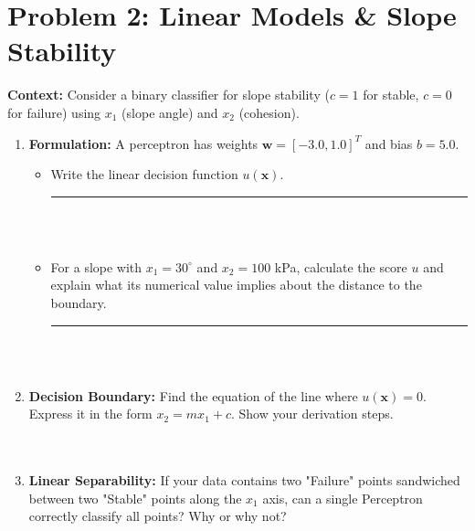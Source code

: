 \documentclass[12pt]{article}
\begin{document}
\section{Problem 2: Linear Models \& Slope Stability}
\textbf{Context:} Consider a binary classifier for slope stability ($c=1$ for stable, $c=0$ for failure) using $x_1$ (slope angle) and $x_2$ (cohesion).

\begin{enumerate}[label=(\alph*)]
    \item \textbf{Formulation:} A perceptron has weights $\bm{w} = [-3.0, 1.0]^T$ and bias $b = 5.0$. 
    \begin{itemize}
        \item Write the linear decision function $u(\bm{x})$. \rule{2.5in}{0.15mm} \\
        
        \fullunderline \\
        
        \item For a slope with $x_1 = 30^\circ$ and $x_2 = 100$ kPa, calculate the score $u$ and explain what its numerical value implies about the distance to the boundary. \rule{1in}{0.15mm} \\
        
        \fullunderline \\
        
    \end{itemize}

    \item \textbf{Decision Boundary:} Find the equation of the line where $u(\bm{x}) = 0$. Express it in the form $x_2 = m x_1 + c$. Show your derivation steps. \\
    
    \fullunderline \\
    
    \fullunderline \\

    \item \textbf{Linear Separability:} If your data contains two "Failure" points sandwiched between two "Stable" points along the $x_1$ axis, can a single Perceptron correctly classify all points? Why or why not? \\
   
    \fullunderline \\
    
    \fullunderline \\
    
\end{enumerate}
\end{document}
